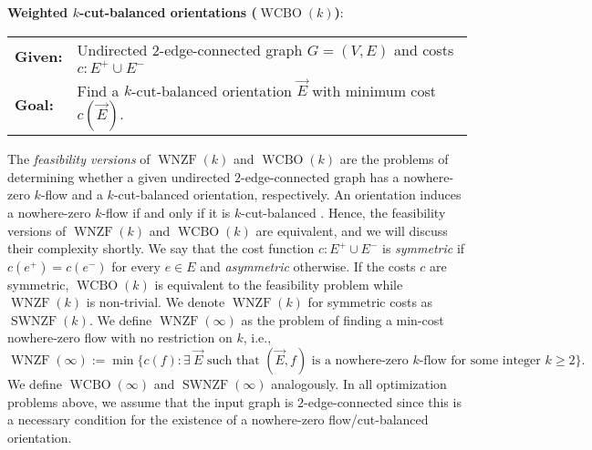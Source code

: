 \documentclass[11pt]{article}
\begin{document}
\begin{mdframed}
\textbf{Weighted $k$-cut-balanced orientations ($\operatorname{WCBO}(k)$)}:\\
\begin{tabular}{ l l }
\textbf{Given:}& Undirected $2$-edge-connected graph $G=(V, E)$ and costs $c: E^+\cup E^-$ \\
\textbf{Goal:}& Find a $k$-cut-balanced orientation $\vec{E}$ with minimum cost $c(\vec{E})$.
\end{tabular}
\end{mdframed}

The \emph{feasibility versions} of  $\operatorname{WNZF}(k)$ and $\operatorname{WCBO}(k)$ are the problems of determining whether a given undirected $2$-edge-connected graph has a nowhere-zero $k$-flow and a $k$-cut-balanced orientation, respectively. An orientation induces a nowhere-zero $k$-flow if and only if it is $k$-cut-balanced \cite{jaeger1976balanced, goddyn2001open,goddyn1998k,thomassen2012weak}. Hence, the feasibility versions of  $\operatorname{WNZF}(k)$ and $\operatorname{WCBO}(k)$ are equivalent, and we will discuss their complexity shortly. 
We say that the cost function $c: E^+\cup E^-$ is \emph{symmetric} if $c(e^+)=c(e^-)$ for every $e\in E$ and \emph{asymmetric} otherwise. If the costs $c$ are symmetric, $\operatorname{WCBO}(k)$ is equivalent to the feasibility problem while $\operatorname{WNZF}(k)$ is non-trivial. We denote $\operatorname{WNZF}(k)$ for symmetric costs as $\operatorname{SWNZF}(k)$. We define $\operatorname{WNZF}(\infty)$ as the problem of finding a min-cost nowhere-zero flow with no restriction on $k$, i.e., 
\[
\operatorname{WNZF}(\infty):=\min\{c(f): \exists\ \vec{E} \text{ such that $(\vec{E}, f)$ is a nowhere-zero $k$-flow for some integer $k\ge 2$}\}. 
\]
We define $\operatorname{WCBO}(\infty)$  and $\operatorname{SWNZF}(\infty)$ analogously. 
In all optimization problems above, we assume that the input graph is $2$-edge-connected since this is a necessary condition for the existence of a nowhere-zero flow/cut-balanced orientation. 
\end{document}
